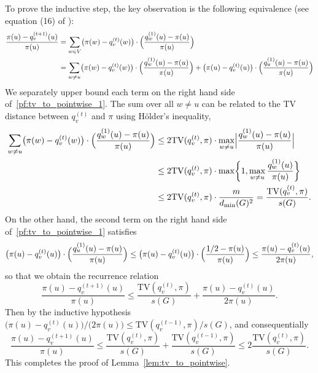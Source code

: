 	To prove the inductive step, the key observation is the following equivalence (see equation (16) of \citep{morris2005}):
	\begin{align}
	\label{pf:tv_to_pointwise_1}
	\frac{\pi(u) - q_v^{(t + 1)}(u)}{\pi(u)} & = \sum_{w \in V} \bigl(\pi(w) - q_v^{(t)}(w) \bigr) \cdot \Bigl(\frac{q_w^{(1)}(u) - \pi(u)}{\pi(u)}\Bigr) \nonumber \\
	& = \sum_{w \neq u} \bigl(\pi(w) - q_v^{(t)}(w) \bigr) \cdot \Bigl(\frac{q_w^{(1)}(u) - \pi(u)}{\pi(u)}\Bigr) + \bigl(\pi(u) - q_v^{(t)}(u) \bigr) \cdot \Bigl(\frac{q_u^{(1)}(u) - \pi(u)}{\pi(u)}\Bigr)
	\end{align}
	We separately upper bound each term on the right hand side of~\eqref{pf:tv_to_pointwise_1}. The sum over all $w \neq u$ can be related to the TV distance between $q_v^{(t)}$ and $\pi$ using H{\"o}lder's inequality,
	\begin{align*}
	\sum_{w \neq u} \bigl(\pi(w) - q_v^{(t)}(w) \bigr) \cdot \Bigl(\frac{q_w^{(1)}(u) - \pi(u)}{\pi(u)}\Bigr) & \leq 2\mathrm{TV}(q_v^{(t)},\pi) \cdot \max_{w \neq u}\Bigl|\frac{q_w^{(1)}(u) - \pi(u)}{\pi(u)}\Bigr| \\
	& \leq 2\mathrm{TV}(q_v^{(t)},\pi) \cdot \max\biggl\{1, \max_{w \neq u} \frac{q_w^{(1)}(u)}{\pi(u)} \biggr\} \\
	& \leq 2\mathrm{TV}(q_v^{(t)},\pi) \cdot \frac{m}{d_{\min}(G)^2} = \frac{\mathrm{TV}(q_v^{(t)},\pi) }{s(G)}.
	\end{align*}
	On the other hand, the second term on the right hand side of~\eqref{pf:tv_to_pointwise_1} satisfies
	\begin{align*}
	\bigl(\pi(u) - q_v^{(t)}(u) \bigr) \cdot \Bigl(\frac{q_u^{(1)}(u) - \pi(u)}{\pi(u)}\Bigr) \leq \bigl(\pi(u) - q_v^{(t)}(u) \bigr) \cdot \Bigl(\frac{1/2 - \pi(u)}{\pi(u)}\Bigr) \leq \frac{\pi(u) - q_v^{(t)}(u)}{2\pi(u)},
	\end{align*}
	so that we obtain the recurrence relation
	\begin{equation*}
	\frac{\pi(u) - q_v^{(t + 1)}(u)}{\pi(u)} \leq \frac{\mathrm{TV}(q_v^{(t)},\pi) }{s(G)} +\frac{\pi(u) - q_v^{(t)}(u)}{2\pi(u)}.
	\end{equation*}
	Then by the inductive hypothesis $\bigl(\pi(u) - q_v^{(t)}(u)\bigr)/\bigl(2\pi(u)\bigr) \leq \mathrm{TV}(q_v^{(t - 1)},\pi)/s(G)$, and consequentially
	\begin{equation*}
	\frac{\pi(u) - q_v^{(t + 1)}(u)}{\pi(u)} \leq \frac{\mathrm{TV}(q_v^{(t)},\pi) }{s(G)} + \frac{\mathrm{TV}(q_v^{(t - 1)},\pi) }{s(G)} \leq 2\frac{\mathrm{TV}(q_v^{(t)},\pi)}{s(G)}.
	\end{equation*}
	This completes the proof of Lemma~\ref{lem:tv_to_pointwise}.

